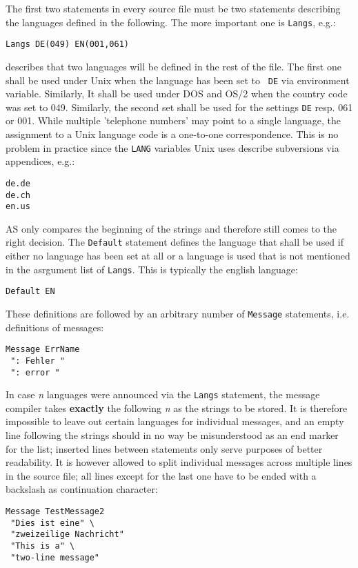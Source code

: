 \documentclass[12pt,twoside]{report}
\begin{document}
The first two statements in every source file must be two statements
describing the languages defined in the following.  The more important one
is {\tt Langs}, e.g.:
\begin{verbatim}
Langs DE(049) EN(001,061)
\end{verbatim}
describes that two languages will be defined in the rest of the file.  The
first one shall be used under Unix when the language has been set to {\tt
DE} via environment variable.  Similarly, It shall be used under DOS and
OS/2 when the country code was set to 049.  Similarly, the second set
shall be used for the settings {\tt DE} resp. 061 or 001.  While multiple
'telephone numbers' may point to a single language, the assignment to a
Unix language code is a one-to-one correspondence.  This is no problem in
practice since the {\tt LANG} variables Unix uses describe subversions via
appendices, e.g.:
\begin{verbatim}
de.de
de.ch
en.us
\end{verbatim}
AS only compares the beginning of the strings and therefore still comes to
the right decision.
The {\tt Default} statement defines the language that shall be used if
either no language has been set at all or a language is used that is not
mentioned in the asrgument list of {\tt Langs}.  This is typically the
english language:
\begin{verbatim}
Default EN
\end{verbatim}
These definitions are followed by an arbitrary number of {\tt Message}
statements, i.e. definitions of messages:
\begin{verbatim}
Message ErrName 
 ": Fehler "    
 ": error "     
\end{verbatim}  
In case {\em n} languages were announced via the {\tt Langs} statement,
the message compiler takes {\bf exactly} the following {\em n} as the
strings to be stored.  It is therefore impossible to leave out certain
languages for individual messages, and an empty line following the strings
should in no way be misunderstood as an end marker for the list; inserted
lines between statements only serve purposes of better readability.  It is
however allowed to split individual messages across multiple lines in the
source file; all lines except for the last one have to be ended with a
backslash as continuation character:
\begin{verbatim}
Message TestMessage2
 "Dies ist eine" \  
 "zweizeilige Nachricht"
 "This is a" \
 "two-line message"
\end{verbatim}     
\end{document}
